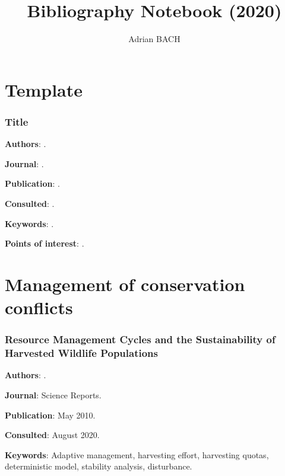 \documentclass[12pt,a4paper]{article}
\author{Adrian BACH}
\title{Bibliography Notebook (2020)}
\begin{document}
\section*{Template}

\subsubsection*{Title}

\textbf{Authors}: \cite{}.

\textbf{Journal}: .

\textbf{Publication}: .

\textbf{Consulted}: .

\textbf{Keywords}: .

\textbf{Points of interest}: .

\newpage

\section*{Management of conservation conflicts}

\subsubsection*{Resource Management Cycles and the Sustainability of Harvested Wildlife Populations}

\textbf{Authors}: \cite{Frixell2010resource}.

\textbf{Journal}: Science Reports.

\textbf{Publication}: May 2010.

\textbf{Consulted}: August 2020.

\textbf{Keywords}: Adaptive management, harvesting effort, harvesting quotas, deterministic model, stability analysis, disturbance.
\end{document}
